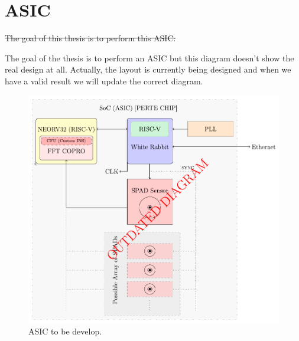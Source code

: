 \newpage
\section{ASIC}
\label{asic}

\st{The goal of this thesis is to perform this ASIC:}

\noindent The goal of the thesis is to perform an ASIC but this diagram doesn't show the real design at all.
Actually, the layout is currently being designed and when we have a valid result we will update the correct diagram.

\begin{figure}[H]
    \centering
    \includegraphics[width=14cm]{figures/ASIC-Diagram.pdf}
    \caption{ASIC to be develop.}
    \label{fig:ASIC}
\end{figure}
